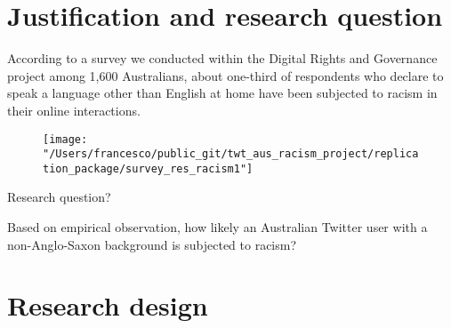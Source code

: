 \documentclass[serif, aspectratio=169]{beamer}
\title{\doctitle \docsubtitle} %
\author{
\large
\textsc{Francesco Bailo (with Gerard Goggin)}\\[2mm] 
\normalsize Department of Media and Communications, The University of Sydney \\
\InstitutePlace
}
\date{3 October 2018}
\begin{document}
{
\begin{frame}
  \titlepage
\end{frame}
}
\addtocounter{framenumber}{-1}

\frame{\tableofcontents}

\section{Justification and research question}

\begin{frame}

According to a survey we conducted within the Digital Rights and Governance project among 1,600 Australians, about one-third of respondents who declare to speak a language other than English at home have been subjected to racism in their online interactions. \autocite{goggin_digital_2017}

\begin{figure}
\texttt{[image: "/Users/francesco/public\_git/twt\_aus\_racism\_project/replication\_package/survey\_res\_racism1"]}
\end{figure}

\end{frame}

\begin{frame}
{Research question?}

Based on empirical observation, how likely an Australian Twitter user with a non-Anglo-Saxon background is subjected to racism?

\end{frame}


\section{Research design}
\end{document}
